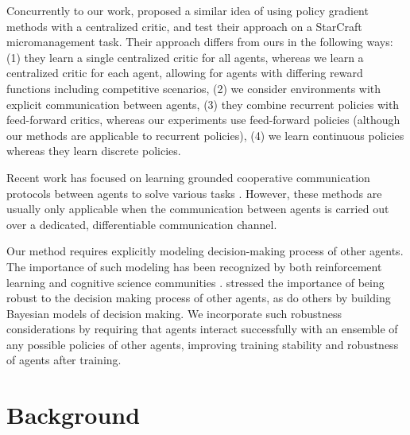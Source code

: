 \documentclass{article}
\begin{document}
Concurrently to our work, \cite{foerster2017counterfactual} proposed a similar idea of using policy gradient methods with a centralized critic, and test their approach on a StarCraft micromanagement task. Their approach differs from ours in the following ways: (1) they learn a single centralized critic for all agents, whereas we learn a centralized critic for each agent, allowing for agents with differing reward functions including competitive scenarios, (2) we consider environments with explicit communication between agents, (3) they combine recurrent policies with feed-forward critics, whereas our experiments use feed-forward policies (although our methods are applicable to recurrent policies), (4) we learn continuous policies whereas they learn discrete policies.  

\nocite{thomas2011conjugate}

Recent work has focused on learning grounded cooperative communication protocols between agents to solve various tasks \cite{sukhbaatar2016learning,foerster16b,mordatch2017emergence}. However, these methods are usually only applicable when the communication between agents is carried out over a dedicated, differentiable communication channel. 





Our method requires explicitly modeling decision-making process of other agents. The importance of such modeling has been recognized by both reinforcement learning \cite{boutilier96,boutilier03} and cognitive science communities \cite{frank_rsa}. \cite{hu98} stressed the importance of being robust to the decision making process of other agents, as do others by building Bayesian models of decision making. We incorporate such robustness considerations by requiring that agents interact successfully with an ensemble of any possible policies of other agents, improving training stability and robustness of agents after training. 



\section{Background}
\label{sec:background}
\end{document}
